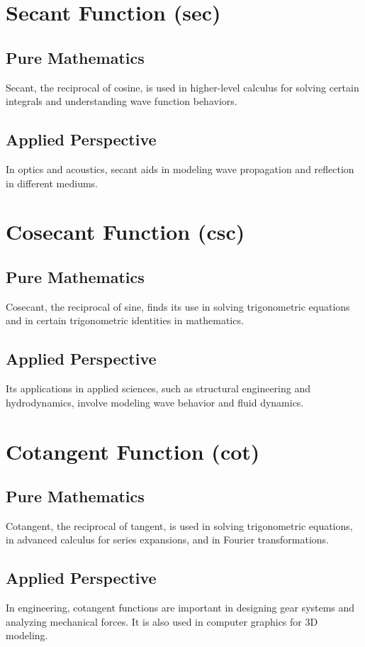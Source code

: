 \documentclass[a4paper,12pt]{book}
\begin{document}
\section*{Secant Function (sec)}
\subsection*{Pure Mathematics}
Secant, the reciprocal of cosine, is used in higher-level calculus for solving certain integrals and understanding wave function behaviors.

\subsection*{Applied Perspective}
In optics and acoustics, secant aids in modeling wave propagation and reflection in different mediums.

\section*{Cosecant Function (csc)}
\subsection*{Pure Mathematics}
Cosecant, the reciprocal of sine, finds its use in solving trigonometric equations and in certain trigonometric identities in mathematics.

\subsection*{Applied Perspective}
Its applications in applied sciences, such as structural engineering and hydrodynamics, involve modeling wave behavior and fluid dynamics.

\section*{Cotangent Function (cot)}
\subsection*{Pure Mathematics}
Cotangent, the reciprocal of tangent, is used in solving trigonometric equations, in advanced calculus for series expansions, and in Fourier transformations.

\subsection*{Applied Perspective}
In engineering, cotangent functions are important in designing gear systems and analyzing mechanical forces. It is also used in computer graphics for 3D modeling.
\end{document}

